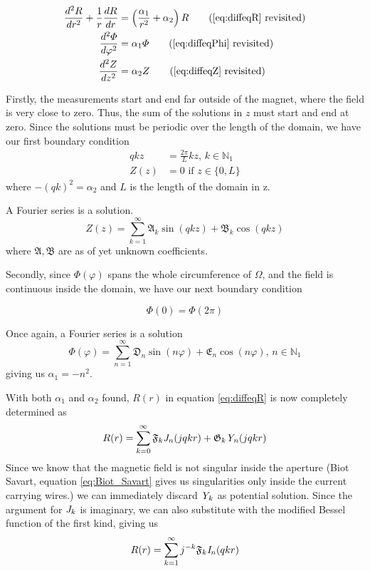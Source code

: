 \begin{align*}
    \frac{d^2R}{dr^2} + \frac{1}{r} \frac{dR}{dr} & =
    \left( \frac{\alpha_1}{r^2} + \alpha_2 \right)R
    \tag{\ref{eq:diffeqR} revisited}                                  \\
    \frac{d^2 \varPhi}{d\varphi^2}                & = \alpha_1\varPhi
    \tag{\ref{eq:diffeqPhi} revisited}                                \\
    \frac{d^2 Z}{dz^2}                            & = \alpha_2 Z
    \tag{\ref{eq:diffeqZ} revisited}
\end{align*}

Firstly, the measurements start and end far outside of the magnet,
where the field is very close to zero. Thus, the sum of the solutions
in $z$ must start and end at zero. Since the solutions must be periodic
over the length of the domain, we have our first boundary condition
\begin{align}
    qkz  & = \frac{2\pi}{L}kz, \,k\in\mathbb{N}_1 \\
    Z(z) & = 0\text{ if } z\in\{0,L\}
\end{align}
where $-(qk)^2 = \alpha_2$ and $L$ is the length of the domain in z.

A Fourier series is a solution.
\begin{equation}
    Z(z) = \sum\limits_{k=1}^{\infty}
    \mathfrak{A}_k\sin{(qkz)} + \mathfrak{B}_k\cos{(qkz)}
\end{equation}
where $\mathfrak{A, B}$ are as of yet unknown coefficients.

Secondly, since $\varPhi(\varphi)$ spans the whole circumference of
$\Omega$, and the field is continuous inside the domain, we have
our next boundary condition

\begin{equation}
    \varPhi(0) = \varPhi(2\pi)
\end{equation}

Once again, a Fourier series is a solution
\begin{equation}
    \varPhi(\varphi) = \sum\limits_{n=1}^{\infty}
    \mathfrak{D}_n\sin{(n\varphi)} + \mathfrak{E}_n\cos{(n\varphi)}
    , \, n\in\mathbb{N}_1
\end{equation}
giving us $\alpha_1 = -n^2$.

With both $\alpha_1$ and $\alpha_2$ found, $R(r)$ in equation \ref{eq:diffeqR}
is now completely determined as
\begin{equation}
    R(r) = \sum\limits_{k=0}^{\infty}
    \mathfrak{F}_{k}\mathit{J}_{n}(jqkr) + \mathfrak{G}_k\mathit{Y}_{n}(jqkr)
\end{equation}
Since we know that the magnetic field is not singular inside the aperture
(Biot Savart, equation \ref{eq:Biot_Savart} gives us singularities only inside
the current carrying wires.) we can immediately discard $\mathit{Y}_{k}$ as potential
solution. Since the argument for $\mathit{J}_{k}$ is imaginary, we can also substitute
with the modified Bessel function of the first kind, giving us
\begin{equation}
    R(r) = \sum\limits_{k=1}^{\infty}
    j^{-k}\mathfrak{F}_{k}\mathit{I}_{n}(qkr)
\end{equation}

